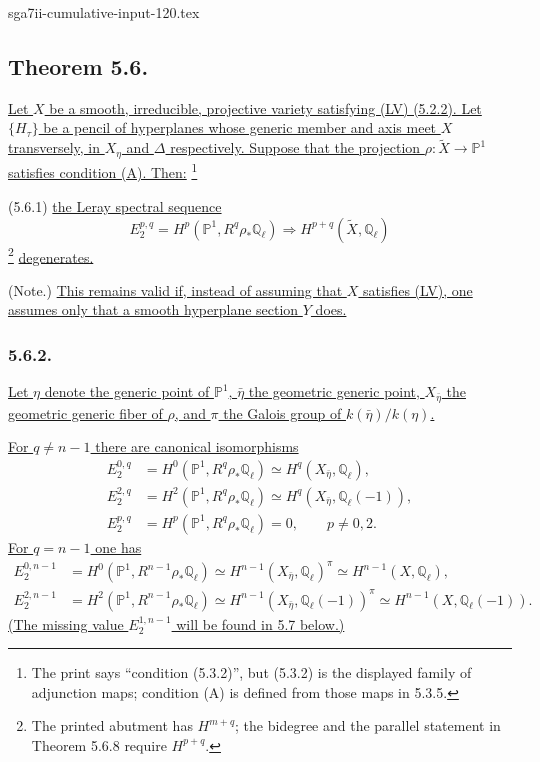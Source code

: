 \begin{filecontents*}{sga7ii-cumulative-input-120.tex}
\subsection*{Theorem 5.6.}
\underline{Let $X$ be a smooth, irreducible, projective variety satisfying
(LV) (5.2.2).  Let $\{H_\tau\}$ be a pencil of hyperplanes whose generic
member and axis meet $X$ transversely, in $X_\eta$ and $\Delta$ respectively.
Suppose that the projection
$\rho:\widetilde X\to\mathbb P^1$ satisfies condition (A).  Then:}
\footnote{The print says ``condition (5.3.2)'', but (5.3.2) is the displayed
family of adjunction maps; condition (A) is defined from those maps in 5.3.5.}

\smallskip
\noindent
\textup{(5.6.1)}\quad
\underline{the Leray spectral sequence}
\[
E_2^{p,q}=H^p(\mathbb P^1,R^q\rho_*\mathbb Q_\ell)
\Longrightarrow H^{p+q}(\widetilde X,\mathbb Q_\ell)
\]
\footnote{The printed abutment has $H^{m+q}$; the bidegree and the parallel
statement in Theorem 5.6.8 require $H^{p+q}$.}
\underline{degenerates.}

\noindent
\textup{(Note.)}\quad
\underline{This remains valid if, instead of assuming that $X$ satisfies
(LV), one assumes only that a smooth hyperplane section $Y$ does.}

\subsubsection*{5.6.2.}
\underline{Let $\eta$ denote the generic point of $\mathbb P^1$,
$\bar\eta$ the geometric generic point, $X_{\bar\eta}$ the geometric generic
fiber of $\rho$, and $\pi$ the Galois group of
$k(\bar\eta)/k(\eta)$.}

\underline{For $q\neq n-1$ there are canonical isomorphisms}
\begin{align}
E_2^{0,q}
 &=H^0(\mathbb P^1,R^q\rho_*\mathbb Q_\ell)
 \simeq H^q(X_{\bar\eta},\mathbb Q_\ell),
 \tag{5.6.2.1}\\
E_2^{2,q}
 &=H^2(\mathbb P^1,R^q\rho_*\mathbb Q_\ell)
 \simeq H^q(X_{\bar\eta},\mathbb Q_\ell(-1)),
 \tag{5.6.2.2}\\
E_2^{p,q}
 &=H^p(\mathbb P^1,R^q\rho_*\mathbb Q_\ell)=0,
 \qquad p\neq0,2.
 \tag{5.6.2.3}
\end{align}
\underline{For $q=n-1$ one has}
\begin{align}
E_2^{0,n-1}
 &=H^0(\mathbb P^1,R^{n-1}\rho_*\mathbb Q_\ell)
 \simeq H^{n-1}(X_{\bar\eta},\mathbb Q_\ell)^\pi
 \simeq H^{n-1}(X,\mathbb Q_\ell),
 \tag{5.6.2.4}\\
E_2^{2,n-1}
 &=H^2(\mathbb P^1,R^{n-1}\rho_*\mathbb Q_\ell)
 \simeq H^{n-1}(X_{\bar\eta},\mathbb Q_\ell(-1))^\pi
 \simeq H^{n-1}(X,\mathbb Q_\ell(-1)).
 \tag{5.6.2.5}
\end{align}
\underline{(The missing value $E_2^{1,n-1}$ will be found in 5.7 below.)}


\end{filecontents*}
